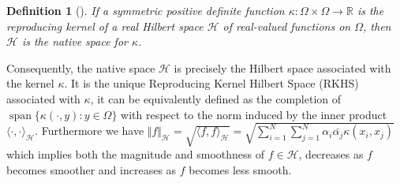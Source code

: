\documentclass[preprint,review,sort&compress,3p]{elsarticle}
\newtheorem{dnt}{Definition}[section]
\begin{document}
\begin{dnt}[\cite{R-1999}]
	\label{native_space}
	If a symmetric positive definite function $\kappa:\Omega \times \Omega \rightarrow \mathbb{R}$	is the reproducing kernel of a real Hilbert space { $\mathcal{H}$} of real-valued functions on $\Omega$, then { $\mathcal{H}$} is the native space for $\kappa$.
\end{dnt}



{ 
Consequently, the native space $\mathcal{H}$ is precisely the Hilbert space associated with the kernel $\kappa$. It is the unique Reproducing Kernel Hilbert Space (RKHS) associated with $\kappa$, 
it can be equivalently defined as the completion of $\operatorname{span}\{\kappa(\cdot, y): y \in \Omega\}$ with respect to the norm induced by the inner product $\langle \cdot, \cdot \rangle_{\mathcal{H}}$.
}
 Furthermore we have $\Vert f\Vert_\mathcal{H} = \sqrt{\langle f,f \rangle_\mathcal{H}} = \sqrt{\sum\limits_{i=1}^N\sum\limits_{j = 1}^N \alpha_i \bar{\alpha_j} \kappa(x_i,x_j) }$ which implies both the magnitude and smoothness of  $f\in \mathcal{H}$, decreases as $f$ becomes smoother and increases as $f$ becomes less smooth.
\end{document}
